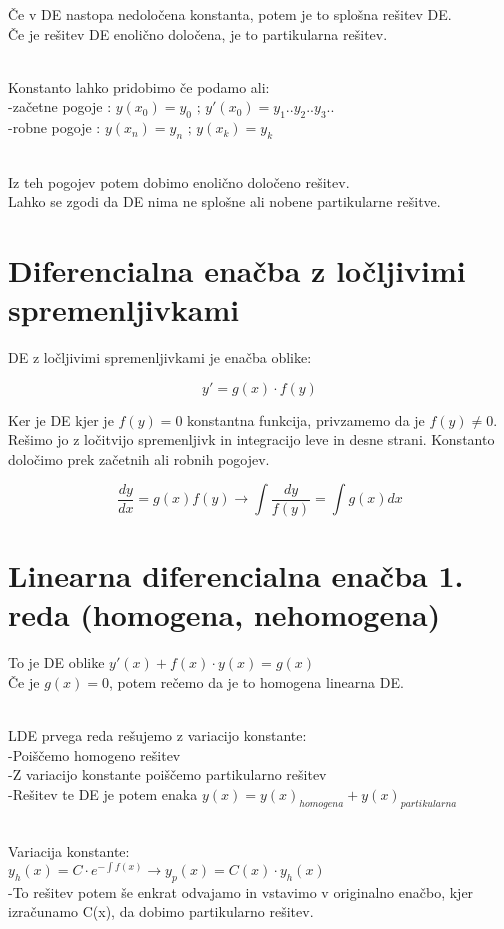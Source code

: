 \documentclass[12pt]{report}
\begin{document}
Če v DE nastopa nedoločena konstanta, potem je to splošna rešitev DE.\\
Če je rešitev DE enolično določena, je to partikularna rešitev.\\\

Konstanto lahko pridobimo če podamo ali:\\
-začetne pogoje : $y(x_0) = y_0 \text{ ; } y'(x_0)=y_1..y_2..y_3..$\\
-robne pogoje : $y(x_n)= y_n \text{ ; } y(x_k) = y_k$\\\

Iz teh pogojev potem dobimo enolično določeno rešitev.\\
Lahko se zgodi da DE nima ne splošne ali nobene partikularne rešitve.


\section*{Diferencialna enačba z ločljivimi spremenljivkami}

DE z ločljivimi spremenljivkami je enačba oblike:

\[y'=g(x)\cdot f(y)\]

Ker je DE kjer je $f(y) =0$ konstantna funkcija, privzamemo da je $f(y) \neq 0$.
Rešimo jo z ločitvijo spremenljivk in integracijo leve in desne strani. Konstanto določimo prek začetnih ali robnih pogojev.

\[
\frac{dy}{dx}=g(x)f(y)\rightarrow \int \frac{dy}{f(y)}= \int g(x)dx
\]


\section*{Linearna diferencialna enačba 1. reda (homogena, nehomogena)}
To je DE oblike $y'(x)+f(x)\cdot y(x) = g(x)$\\
 
Če je $g(x) = 0$, potem rečemo da je to homogena linearna DE.\\\

LDE prvega reda rešujemo z variacijo konstante:\\
-Poiščemo homogeno rešitev\\
-Z variacijo konstante poiščemo partikularno rešitev\\
-Rešitev te DE je potem enaka $y(x) = y(x)_{homogena}+y(x)_{partikularna}$ \\\

Variacija konstante:\\
$y_{h}(x)  = C\cdot e^{-\int f(x)}\rightarrow y_p(x)=C(x)\cdot y_h(x)$\\
-To rešitev potem še enkrat odvajamo in vstavimo v originalno enačbo, kjer izračunamo C(x), da dobimo partikularno rešitev.\\\
\end{document}
